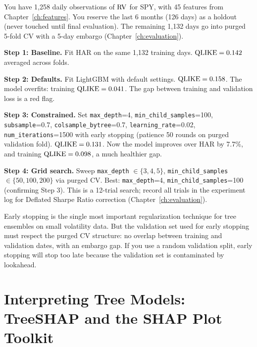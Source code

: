 \begin{workedexample}
You have 1,258 daily observations of $\operatorname{RV}$ for SPY, with 45 features from
Chapter~\ref{ch:features}.  You reserve the last 6 months (126 days) as a
holdout (never touched until final evaluation).  The remaining 1,132 days
go into purged 5-fold CV with a 5-day embargo
(Chapter~\ref{ch:evaluation}).

\textbf{Step 1: Baseline.}  Fit HAR on the same 1,132 training days.
$\operatorname{QLIKE} = 0.142$ averaged across folds.

\textbf{Step 2: Defaults.}  Fit LightGBM with default settings.
$\operatorname{QLIKE} = 0.158$.  The model overfits: training $\operatorname{QLIKE} = 0.041$.
The gap between training and validation loss is a red flag.

\textbf{Step 3: Constrained.}  Set \texttt{max\_depth}=4,
\texttt{min\_child\_samples}=100, \texttt{subsample}=0.7,
\texttt{colsample\_bytree}=0.7, \texttt{learning\_rate}=0.02,
\texttt{num\_iterations}=1500 with early stopping (patience 50 rounds on
purged validation fold).  $\operatorname{QLIKE} = 0.131$.  Now the model improves over
HAR by 7.7\%, and training $\operatorname{QLIKE} = 0.098$, a much healthier gap.

\textbf{Step 4: Grid search.}  Sweep \texttt{max\_depth} $\in \{3,4,5\}$,
\texttt{min\_child\_samples} $\in \{50, 100, 200\}$ via purged CV.  Best:
\texttt{max\_depth}=4, \texttt{min\_child\_samples}=100 (confirming
Step 3).  This is a 12-trial search; record all trials in the experiment log
for Deflated Sharpe Ratio correction (Chapter~\ref{ch:evaluation}).
\end{workedexample}

\begin{keyidea}
Early stopping is the single most important regularization technique for
tree ensembles on small volatility data.  But the validation set used for
early stopping must respect the purged CV structure: no overlap between
training and validation dates, with an embargo gap.  If you use a random
validation split, early stopping will stop too late because the validation
set is contaminated by lookahead.
\end{keyidea}


\section{Interpreting Tree Models: TreeSHAP and the SHAP Plot Toolkit}\label{sec:trees:treeshap}

